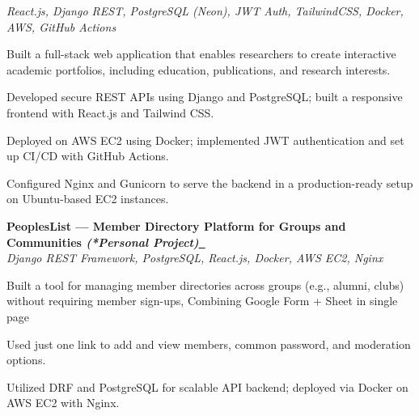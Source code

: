 \documentclass[letterpaper,10pt]{article}
\let\hrefWithoutArrow\href
\newcommand{\hrefWithArrow}[2]{\hrefWithoutArrow{#1}{#2\ \raisebox{.15ex}{\footnotesize $\to$}}}
\newcommand{\heading}[2]{
  \hspace{10pt}#1\hfill#2\\
}
\newcommand{\headingBf}[2]{
  \heading{\textbf{#1}}{\textbf{#2}}
}
\newcommand{\headingIt}[2]{
  \heading{\textit{#1}}{\textit{#2}}
}
\newenvironment{resume_list}{
  \vspace{-7pt}
  \begin{itemize}[itemsep=-2px, parsep=1pt, leftmargin=30pt]
}{
  \end{itemize}
}
\begin{document}
\headingIt{React.js, Django REST, PostgreSQL (Neon), JWT Auth, TailwindCSS, Docker, AWS, GitHub Actions}{}
\begin{resume_list}
    \item Built a full-stack web application that enables researchers to create interactive academic portfolios, including education, publications, and research interests.
    \item Developed secure REST APIs using Django and PostgreSQL; built a responsive frontend with React.js and Tailwind CSS.
    \item Deployed on AWS EC2 using Docker; implemented JWT authentication and set up CI/CD with GitHub Actions.
    \item Configured Nginx and Gunicorn to serve the backend in a production-ready setup on Ubuntu-based EC2 instances.
\end{resume_list}

\headingBf{PeoplesList — Member Directory Platform for Groups and Communities \textit{(*Personal Project)}}{\textcolor[HTML]{336e55}{\hrefWithArrow{https://youtu.be/Xjsnj2PNt-U?si=jquuoOViqf1IDiil}{\textbullet{Project Video}}}}

\headingIt{Django REST Framework, PostgreSQL, React.js, Docker, AWS EC2, Nginx}{}
\begin{resume_list}
    \item Built a tool for managing member directories across groups (e.g., alumni, clubs) without requiring member sign-ups, Combining Google Form + Sheet in single page
    \item Used just one link to add and view members, common password, and moderation options.
    \item Utilized DRF and PostgreSQL for scalable API backend; deployed via Docker on AWS EC2 with Nginx.
\end{resume_list}







\end{document}

